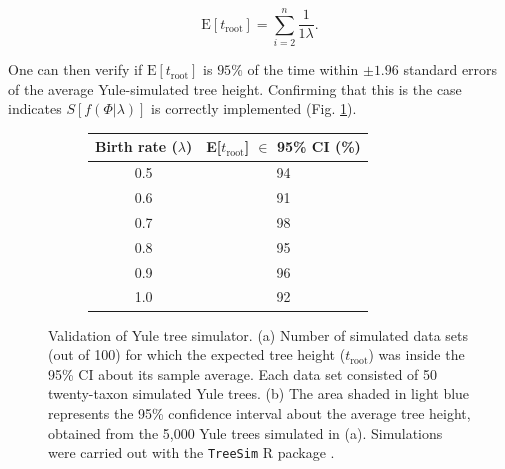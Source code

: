 \documentclass[oneside]{article}
\begin{document}
\begin{equation}
  \text{E}[t_{\text{root}}] = \sum_{i=2}^{n}\frac{1}{1\lambda}.
  \label{eq:yule}
\end{equation}

\noindent One can then verify if $\text{E}[t_{\text{root}}]$ is $95\%$
of the time within $\pm 1.96$ standard errors of the average Yule-simulated tree
height.
Confirming that this is the case indicates $S[f(\Phi|\lambda)]$ is correctly
implemented (Fig. \ref{fig:yulemean}).

\begin{figure}
  \centering
  \vspace{0pt}
  \begin{subfigure}[t]{0.5\textwidth}
    \caption{}
    \centering
    \begin{tabular}{ c|c }
    \hline
    Birth rate ($\lambda$) & E[$t_{\text{root}}$] $\in$ 95\% CI (\%)\\
    \hline  
    0.5 & 94\\
    0.6 & 91\\
    0.7 & 98\\
    0.8 & 95\\
    0.9 & 96\\
    1.0 & 92\\
    \hline
  \end{tabular}
  \end{subfigure}
  \vspace{0pt}
  \hspace{1cm}
  \begin{subfigure}[t]{0.4\textwidth}
    \caption{}
    \centering
        
  \end{subfigure}
  \hfill
  \caption{Validation of Yule tree simulator.
    (a) Number of simulated data sets (out of 100) for which the
    expected tree height ($t_{\text{root}}$) was inside the 95\% CI
    about its sample average.
    Each data set consisted of 50 twenty-taxon simulated Yule trees.
    (b) The area shaded in light blue represents the
    95\% confidence interval about the average tree height, obtained
    from the 5,000 Yule trees simulated in (a). Simulations were
    carried out with the \texttt{TreeSim} R package \citep{stadler11}.}
  \label{fig:yulemean}
\end{figure}
\end{document}
